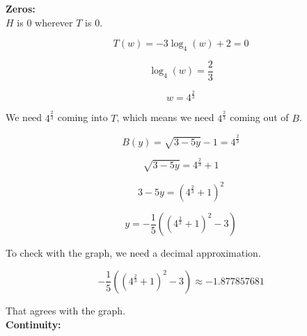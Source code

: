 \documentclass{ximera}
\begin{document}
\textbf{\textcolor{blue!55!black}{Zeros:}} \\



$H$ is $0$ wherever $T$ is $0$.






\[
T(w) = -3 \log_4(w) + 2 = 0
\]


\[
 \log_4(w) = \frac{2}{3}
\]


\[
w = 4^{\tfrac{2}{3}}
\]



We need $4^{\tfrac{2}{3}}$ coming into $T$, which means we need $4^{\tfrac{2}{3}}$ coming out of $B$.





\[
B(y) = \sqrt{3 - 5y} - 1 = 4^{\tfrac{2}{3}}
\]



\[
\sqrt{3 - 5y} = 4^{\tfrac{2}{3}} + 1
\]



\[
3 - 5y = \left( 4^{\tfrac{2}{3}} + 1 \right)^2
\]



\[
y = -\frac{1}{5} \left( \left( 4^{\tfrac{2}{3}} + 1 \right)^2 - 3 \right)
\]


To check with the graph, we need a decimal approximation.






\[
-\frac{1}{5} \left( \left( 4^{\tfrac{2}{3}} + 1 \right)^2 - 3 \right) \approx -1.877857681
\]


That agrees with the graph.\\



































\textbf{\textcolor{blue!55!black}{Continuity:}} \\
\end{document}
